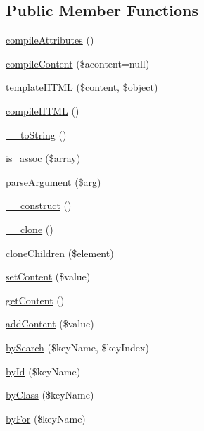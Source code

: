 \subsection*{Public Member Functions}
\begin{DoxyCompactItemize}
\item 
\hyperlink{classhtmlElement_a4e30cd7e3e6d8ad503766d056490c1ef}{compile\+Attributes} ()
\item 
\hyperlink{classhtmlElement_ac05144459b3739d692738dc947f6989c}{compile\+Content} (\$acontent=null)
\item 
\hyperlink{classhtmlElement_af70cbe9883bbe35f9a2573711625cfc4}{template\+H\+T\+M\+L} (\$content, \$\hyperlink{Shape_8php_a774642dc290de09e3aff55c8b594113f}{object})
\item 
\hyperlink{classhtmlElement_ab45087063ba3e42851d01bd87681475b}{compile\+H\+T\+M\+L} ()
\item 
\hyperlink{classhtmlElement_a1ad02d4640ea217cafe77a53d8b916f0}{\+\_\+\+\_\+to\+String} ()
\item 
\hyperlink{classhtmlElement_a26a8e3284834135dec7b0e01e84b0877}{is\+\_\+assoc} (\$array)
\item 
\hyperlink{classhtmlElement_ac36b3e96ac37cad8e499b6dd9dad4511}{parse\+Argument} (\$arg)
\item 
\hyperlink{classhtmlElement_a925a2a3ac520421cc180f391922595af}{\+\_\+\+\_\+construct} ()
\item 
\hyperlink{classhtmlElement_aa52ba0af61d736d37927be6894660cd0}{\+\_\+\+\_\+clone} ()
\item 
\hyperlink{classhtmlElement_a89bb434be414cb5e8422141adf272432}{clone\+Children} (\$element)
\item 
\hyperlink{classhtmlElement_abf6e0bb5133c6b654e38cb6a78dc91a8}{set\+Content} (\$value)
\item 
\hyperlink{classhtmlElement_ab74714929671cc7cf3271404a621f4ae}{get\+Content} ()
\item 
\hyperlink{classhtmlElement_a063bcf0695c98e25ff2b7fa9ef3c88bf}{add\+Content} (\$value)
\item 
\hyperlink{classhtmlElement_a8cc57a9db714d6f615bb169424ba505c}{by\+Search} (\$key\+Name, \$key\+Index)
\item 
\hyperlink{classhtmlElement_a231a77af8cc0ecb36a0714a8888c278f}{by\+Id} (\$key\+Name)
\item 
\hyperlink{classhtmlElement_aae8d6a0e00314fdd72301557161b4054}{by\+Class} (\$key\+Name)
\item 
\hyperlink{classhtmlElement_a329d8c6c7a261b78d39cd4b401320616}{by\+For} (\$key\+Name)

\end{DoxyCompactItemize}
